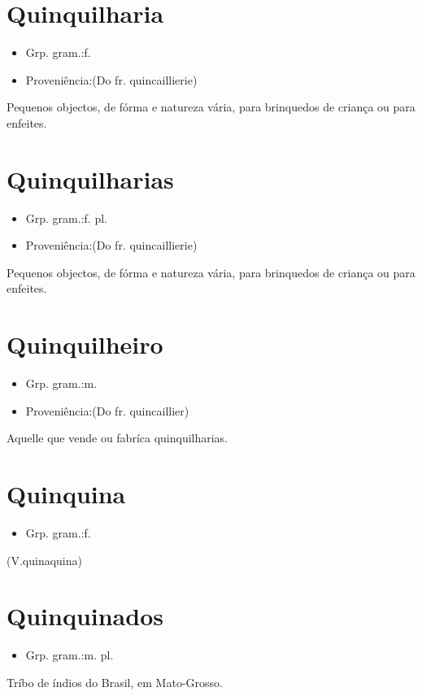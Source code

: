 \section{Quinquilharia}
\begin{itemize}
\item {Grp. gram.:f.}
\end{itemize}
\begin{itemize}
\item {Proveniência:(Do fr. \textunderscore quincaillierie\textunderscore )}
\end{itemize}
Pequenos objectos, de fórma e natureza vária, para brinquedos de criança ou para enfeites.
\section{Quinquilharias}
\begin{itemize}
\item {Grp. gram.:f. pl.}
\end{itemize}
\begin{itemize}
\item {Proveniência:(Do fr. \textunderscore quincaillierie\textunderscore )}
\end{itemize}
Pequenos objectos, de fórma e natureza vária, para brinquedos de criança ou para enfeites.
\section{Quinquilheiro}
\begin{itemize}
\item {Grp. gram.:m.}
\end{itemize}
\begin{itemize}
\item {Proveniência:(Do fr. \textunderscore quincaillier\textunderscore )}
\end{itemize}
Aquelle que vende ou fabríca quinquilharias.
\section{Quinquina}
\begin{itemize}
\item {Grp. gram.:f.}
\end{itemize}
(V.quinaquina)
\section{Quinquinados}
\begin{itemize}
\item {Grp. gram.:m. pl.}
\end{itemize}
Tríbo de índios do Brasil, em Mato-Grosso.
